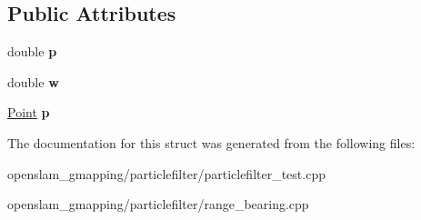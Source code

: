 \subsection*{Public Attributes}
\begin{DoxyCompactItemize}
\item 
\mbox{\label{structParticle_a9ef797ea4feb5eed21755d5d8e99508e}} 
double {\bfseries p}
\item 
\mbox{\label{structParticle_a028e8f8e8bea81aa33c88b5170d69261}} 
double {\bfseries w}
\item 
\mbox{\label{structParticle_a03d99762087a6618850d679012e4a4d6}} 
\hyperlink{structGMapping_1_1point}{Point} {\bfseries p}
\end{DoxyCompactItemize}


The documentation for this struct was generated from the following files\+:\begin{DoxyCompactItemize}
\item 
openslam\+\_\+gmapping/particlefilter/particlefilter\+\_\+test.\+cpp\item 
openslam\+\_\+gmapping/particlefilter/range\+\_\+bearing.\+cpp\end{DoxyCompactItemize}
